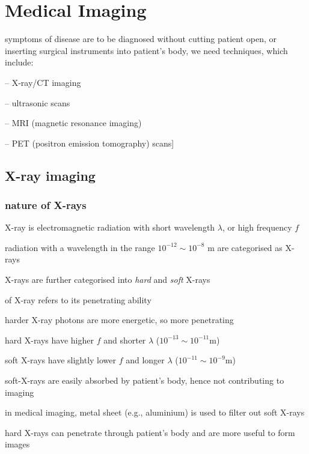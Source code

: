 \section{Medical Imaging}

symptoms of disease are to be diagnosed without cutting patient open, or inserting surgical instruments into patient's body, we need  techniques, which include:

\begin{compactitem}
	\item[--] X-ray/CT imaging
	\item[--] ultrasonic scans
	\item[--] MRI (magnetic resonance imaging)
	\item[--] PET (positron emission tomography) scans] 
\end{compactitem}

\subsection{X-ray imaging}

\subsubsection{nature of X-rays}

X-ray is electromagnetic radiation with short wavelength $\lambda$, or high frequency $f$

radiation with a wavelength in the range $10^{-12}\sim10^{-8}\text{ m}$ are categorised as X-rays

\cmt X-rays are further categorised into \emph{hard} and \emph{soft} X-rays

 of X-ray refers to its penetrating ability

harder X-ray photons are more energetic, so more penetrating
	
hard X-rays have higher $f$ and shorter $\lambda$ ($10^{-13}\sim10^{-11}$m)
	
soft X-rays have slightly lower $f$ and longer $\lambda$ ($10^{-11}\sim10^{-9}$m)

\cmt soft-X-rays are easily absorbed by patient's body, hence not contributing to imaging

in medical imaging, metal sheet (e.g., aluminium) is used to filter out soft X-rays
	
hard X-rays can penetrate through patient's body and are more useful to form images
	
